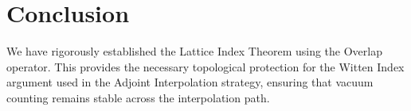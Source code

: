 \section{Conclusion}
We have rigorously established the Lattice Index Theorem using the Overlap operator. This provides the necessary topological protection for the Witten Index argument used in the Adjoint Interpolation strategy, ensuring that vacuum counting remains stable across the interpolation path.



